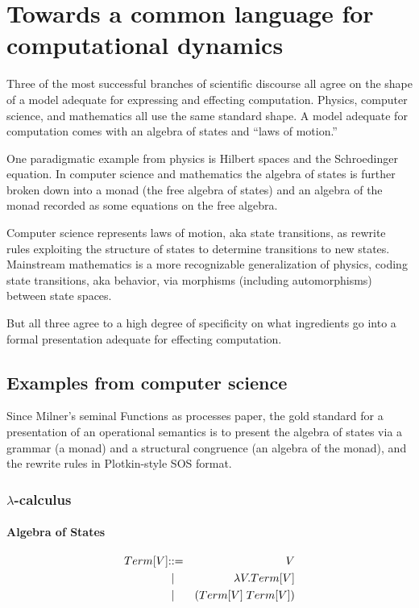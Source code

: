 \section{Towards a common language for computational dynamics}
Three of the most successful branches of scientific discourse all agree on the shape of a model adequate for expressing and effecting computation. Physics, computer science, and mathematics all use the same standard shape. A model adequate for computation comes with an algebra of states and “laws of motion.”

One paradigmatic example from physics is Hilbert spaces and the Schroedinger equation. In computer science and mathematics the algebra of states is further broken down into a monad (the free algebra of states) and an algebra of the monad recorded as some equations on the free algebra.

Computer science represents laws of motion, aka state transitions, as rewrite rules exploiting the structure of states to determine transitions to new states. Mainstream mathematics is a more recognizable generalization of physics, coding state transitions, aka behavior, via morphisms (including automorphisms) between state spaces.

But all three agree to a high degree of specificity on what ingredients go into a formal presentation adequate for effecting computation.

\subsection{Examples from computer science}
Since Milner's seminal Functions as processes paper, the gold standard for a presentation of an operational semantics is to present the algebra of states via a grammar (a monad) and a structural congruence (an algebra of the monad), and the rewrite rules in Plotkin-style SOS format.

\subsubsection{$\lambda$-calculus}

\paragraph{Algebra of States}
\begin{eqnarray*}
  Term[V] & \mathbin{\mathbf{::=}} & V \\
  & \;\mathbin{\mathbf\mid}\; & \lambda V.Term[V] \\
  & \;\mathbin{\mathbf\mid}\; & \mathsf{(} Term[V] \; Term[V] \mathsf{)}
\end{eqnarray*}

